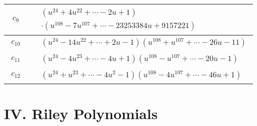 \documentclass[1p]{elsarticle_modified}
\theoremstyle{definition}
\begin{document}
\begin{tabular}{m{50pt}|m{274pt}}
\hline $$\begin{aligned}c_{9}\end{aligned}$$&$\begin{aligned}
&(u^{24}+4 u^{22}+\cdots-2 u+1)\\
&\cdot(u^{108}-7 u^{107}+\cdots-23253384 u+9157221)
\end{aligned}$\\
\hline $$\begin{aligned}c_{10}\end{aligned}$$&$\begin{aligned}
&(u^{24}-14 u^{22}+\cdots+2 u-1)(u^{108}+u^{107}+\cdots-26 u-11)
\end{aligned}$\\
\hline $$\begin{aligned}c_{11}\end{aligned}$$&$\begin{aligned}
&(u^{24}-4 u^{23}+\cdots-4 u+1)(u^{108}- u^{107}+\cdots-20 u-1)
\end{aligned}$\\
\hline $$\begin{aligned}c_{12}\end{aligned}$$&$\begin{aligned}
&(u^{24}+u^{23}+\cdots-4 u^2-1)(u^{108}-4 u^{107}+\cdots-46 u+1)
\end{aligned}$\\
\hline
\end{tabular}\newpage\renewcommand{\arraystretch}{1}
\centering \section*{ IV. Riley Polynomials}
\end{document}
